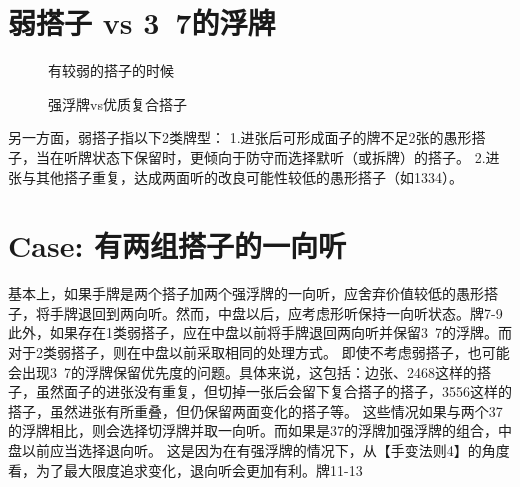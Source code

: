 \section{弱搭子 vs 3~7的浮牌}
\begin{figure}[h]
    \caption{有较弱的搭子的时候}
    \label{lec8:pai11-13}
    \par\bigskip
    \par\bigskip
\end{figure}
\begin{figure}[h]
    \caption{强浮牌vs优质复合搭子}
    \label{lec8:pai14-16}
    \par\bigskip
    \par\bigskip
    \par\bigskip
    
\end{figure}
另一方面，弱搭子指以下2类牌型：
1.进张后可形成面子的牌不足2张的愚形搭子，当在听牌状态下保留时，更倾向于防守而选择默听（或拆牌）的搭子。
2.进张与其他搭子重复，达成两面听的改良可能性较低的愚形搭子（如1334）。
\section{Case: 有两组搭子的一向听}
基本上，如果手牌是两个搭子加两个强浮牌的一向听，应舍弃价值较低的愚形搭子，将手牌退回到两向听。然而，中盘以后，应考虑形听保持一向听状态。牌7-9
此外，如果存在1类弱搭子，应在中盘以前将手牌退回两向听并保留3~7的浮牌。而对于2类弱搭子，则在中盘以前采取相同的处理方式。
即使不考虑弱搭子，也可能会出现3~7的浮牌保留优先度的问题。具体来说，这包括：边张、2468这样的搭子，虽然面子的进张没有重复，但切掉一张后会留下复合搭子的搭子，3556这样的搭子，虽然进张有所重叠，但仍保留两面变化的搭子等。
这些情况如果与两个37的浮牌相比，则会选择切浮牌并取一向听。而如果是37的浮牌加强浮牌的组合，中盘以前应当选择退向听。
这是因为在有强浮牌的情况下，从【手变法则4】的角度看，为了最大限度追求变化，退向听会更加有利。牌11-13

